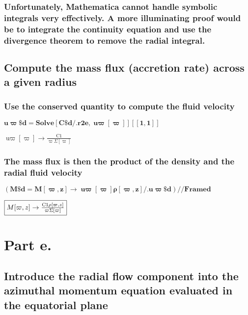 \documentclass{article}
\begin{document}
\subsubsection*{Unfortunately, Mathematica cannot handle symbolic integrals very effectively. A more illuminating proof would be to integrate the
continuity equation and use the divergence theorem to remove the radial integral.}

\subsection*{Compute the mass flux (accretion rate) across a given radius}

\subsubsection*{Use the conserved quantity to compute the fluid velocity}

\begin{doublespace}
\noindent\(\pmb{\text{u$\varpi \$$d} = \text{Solve}[\text{C$\$$d} \text{/.} \text{r2e},\text{u$\varpi $}[\varpi ]][[1,1]]}\)
\end{doublespace}

\begin{doublespace}
\noindent\(\text{u$\varpi $}[\varpi ]\to \frac{\text{C1}}{\varpi  \Sigma [\varpi ]}\)
\end{doublespace}

\subsubsection*{The mass flux is then the product of the density and the radial fluid velocity}

\begin{doublespace}
\noindent\(\pmb{(\text{M$\$$d} = M[\varpi ,z]\to  \text{u$\varpi $}[\varpi ] \rho [\varpi ,z] \text{/.} \text{u$\varpi \$$d}) \text{//}\text{Framed}}\)
\end{doublespace}

\begin{doublespace}
\noindent\(\fbox{$M[\varpi ,z]\to \frac{\text{C1} \rho [\varpi ,z]}{\varpi  \Sigma [\varpi ]}$}\)
\end{doublespace}

\section*{Part e.}

\subsection*{Introduce the radial flow component into the azimuthal momentum equation evaluated in the equatorial plane}
\end{document}
